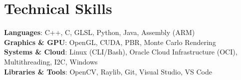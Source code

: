 \documentclass[letterpaper,11pt]{article}
\begin{document}
\section{Technical Skills}
 \begin{itemize}[leftmargin=0.15in, label={}]
    \small{\item{
     \textbf{Languages}{: C++, C, GLSL, Python, Java, Assembly (ARM)} \\
     \textbf{Graphics \& GPU}{: OpenGL, CUDA, PBR, Monte Carlo Rendering} \\
     \textbf{Systems \& Cloud}{: Linux (CLI/Bash), Oracle Cloud Infrastructure (OCI), Multithreading, I2C, Windows} \\
     \textbf{Libraries \& Tools}{: OpenCV, Raylib, Git, Visual Studio, VS Code}
    }}
 \end{itemize}


\end{document}

